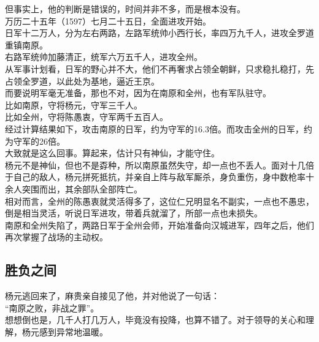 \begin{multicols}{\theparacolNo}
但事实上，他的判断是错误的，时间并非不多，而是根本没有。\\

万历二十五年（1597）七月二十五日，全面进攻开始。\\

日军十二万人，分为左右两路，左路军统帅小西行长，率四万九千人，进攻全罗道重镇南原。\\

右路军统帅加藤清正，统军六万五千人，进攻全州。\\

从军事计划看，日军的野心并不大，他们不再奢求占领全朝鲜，只求稳扎稳打，先占领全罗道，以此处为基地，逼近王京。\\

而要说明军毫无准备，那也不对，因为在南原和全州，也有军队驻守。\\

比如南原，守将杨元，守军三千人。\\

比如全州，守将陈愚衷，守军两千五百人。\\

经过计算结果如下，攻击南原的日军，约为守军的16.3倍。而攻击全州的日军，约为守军的26倍。\\

大致就是这么回事。算起来，估计只有神仙，才能守住。\\

杨元不是神仙，但也不是孬种，所以南原虽然失守，却一点也不丢人。面对十几倍于自己的敌人，杨元拼死抵抗，并亲自上阵与敌军厮杀，身负重伤，身中数枪率十余人突围而出，其余部队全部阵亡。\\

相对而言，全州的陈愚衷就灵活得多了，这位仁兄明显名不副实，一点也不愚忠，倒是相当灵活，听说日军进攻，带着兵就溜了，所部一点也未损失。\\

南原和全州失陷了，两路日军于全州会师，开始准备向汉城进军，四年之后，他们再次掌握了战场的主动权。\\

\subsection{胜负之间}
杨元逃回来了，麻贵亲自接见了他，并对他说了一句话：\\

“南原之败，非战之罪”。\\

想想倒也是，几千人打几万人，毕竟没有投降，也算不错了。对于领导的关心和理解，杨元感到异常地温暖。\\


\end{multicols}
